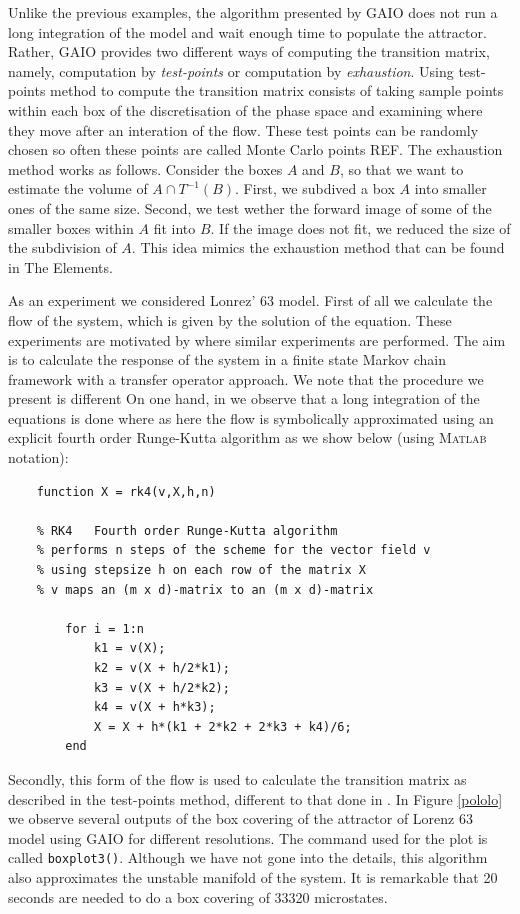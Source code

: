  Unlike the previous examples, the algorithm presented by GAIO does not run a long integration of the model and wait enough time to populate the attractor. Rather, GAIO provides two different ways of computing the transition matrix, namely, computation by \emph{test-points} or computation by \emph{exhaustion}. Using test-points method to compute the transition matrix consists of taking sample points within each box of the discretisation of the phase space and examining where they move after an interation of the flow. These test points can be randomly chosen so often these points are called Monte Carlo points REF. The exhaustion method works as follows. Consider the boxes $A$ and $B$, so that we want to estimate the volume of $A\cap T^{-1}(B)$. First, we subdived a box $A$ into smaller ones of the same size. Second, we test wether the forward image of some of the smaller boxes within $A$ fit into $B$. If the image does not fit, we reduced the size of the subdivision of $A$. This idea mimics the exhaustion method that can be found in The Elements.

As an experiment we considered Lonrez' 63 model. First of all we calculate the flow of the system, which is given by the solution of the equation. These experiments are motivated by \cite{lucarini} where similar experiments are performed. The aim is to calculate the response of the system in a finite state Markov chain framework with a transfer operator approach. We note that the procedure we present is different  On one hand, in \cite{lucarini} we observe that a long integration of the equations is done where as here the flow is symbolically approximated using an explicit fourth order Runge-Kutta algorithm as we show below (using \textsc{\textsc{Matlab}\xspace} notation):

\begin{verbatim}
	function X = rk4(v,X,h,n)
	
	% RK4   Fourth order Runge-Kutta algorithm 
	% performs n steps of the scheme for the vector field v
	% using stepsize h on each row of the matrix X
	% v maps an (m x d)-matrix to an (m x d)-matrix 
	
	    for i = 1:n
	        k1 = v(X);
	        k2 = v(X + h/2*k1);
	        k3 = v(X + h/2*k2);
	        k4 = v(X + h*k3);
	        X = X + h*(k1 + 2*k2 + 2*k3 + k4)/6;
	    end
\end{verbatim}
Secondly, this form of the flow is used to calculate the transition matrix as described in the test-points method, different to that done in \cite{lucarini}. In Figure \ref{pololo} we observe several outputs of the box covering of the attractor of Lorenz 63 model using GAIO for different resolutions. The command used for the plot is called \texttt{boxplot3()}. Although we have not gone into the details, this algorithm also approximates the unstable manifold of the system. It is remarkable that 20 seconds are needed to do a box covering of 33320 microstates.  

